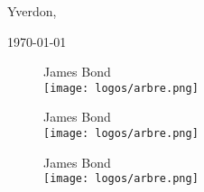 \documentclass{rapport}
\begin{document}







\fairepagedegarde %
\thispagestyle{noPage}
\tabledematieres %
\thispagestyle{noPage}
\newpage
\listoffigures
\listoftables
\clearpage
\setcounter{page}{1}
\fairemarges %







%



\begin{flushright}
    Yverdon, {\today\par}
\end{flushright}

\begin{figure}[H]
    \centering
    \begin{minipage}[b]{0.3\textwidth}
      \centering
      James Bond\\
      \texttt{[image: logos/arbre.png]}
    \end{minipage}
    \hfill
    \begin{minipage}[b]{0.3\textwidth}
      \centering
      James Bond\\
      \texttt{[image: logos/arbre.png]}
    \end{minipage}
    \hfill
    \begin{minipage}[b]{0.3\textwidth}
      \centering
      James Bond\\
      \texttt{[image: logos/arbre.png]}
    \end{minipage}
  \end{figure}

\newpage
\printbibliography %

\newpage
\appendix

% 
% 
\end{document}
